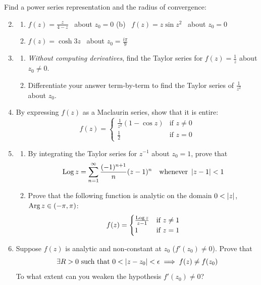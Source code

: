 \begin{exercises}
	\exstart Find a power series representation and the radius of convergence:
	\begin{enumerate}\setcounter{enumi}{1}
	  \item[]\begin{enumerate}
	    \item $f(z)=\frac z{4-z}$ \ about $z_0=0$
	    \qquad\qquad
	    (b) \ $f(z)=z\sin z^2$ \ about $z_0=0$
	    \setcounter{enumii}{2}
	    \item $f(z)=\cosh 3z$ \ about $z_0=\frac{i\pi}9$
		\end{enumerate}
		
		
		\item\begin{enumerate}
		  \item \emph{Without computing derivatives}, find the Taylor series for $f(z)=\frac 1z$ about $z_0\neq 0$.
		  \item Differentiate your answer term-by-term to find the Taylor series of $\frac 1{z^2}$ about $z_0$.
		\end{enumerate} 
		
		
		\item By expressing $f(z)$ as a Maclaurin series, show that it is entire:
		\[
			f(z)=
			\begin{cases} 
				\frac 1{z^2}(1-\cos z)&\text{if }z\neq 0\\
				\frac 12&\text{if }z=0
			\end{cases}
		\]
		
		
		\item\begin{enumerate}
		  \item By integrating the Taylor series for $z^{-1}$ about $z_0=1$, prove that 
		  \[
		  	\operatorname{Log} z=\sum_{n=1}^\infty\frac{(-1)^{n+1}}n(z-1)^n
		  	\quad\text{whenever }\left| z-1\right|<1
		  \]
		  \item Prove that the following function is analytic on the domain $0<\left| z\right|$, \ $\operatorname{Arg} z\in(-\pi,\pi)$:
		  \[
		  	f(z)=
		  	\begin{cases} 
					\frac{\operatorname{Log} z}{z-1}&\text{if }z\neq 1\\
					1&\text{if }z=1
				\end{cases}
			\]
		\end{enumerate}
		
		
		\item Suppose $f(z)$ is analytic and non-constant at $z_0$ ($f'(z_0)\neq 0$). Prove that
		\[
			\exists R>0\ \text{such that}\ 0<\left| z-z_0\right|<\epsilon\implies f(z)\neq f(z_0)
		\]
		To what extent can you weaken the hypothesis $f'(z_0)\neq 0$?
		

\end{enumerate}
\end{exercises}
